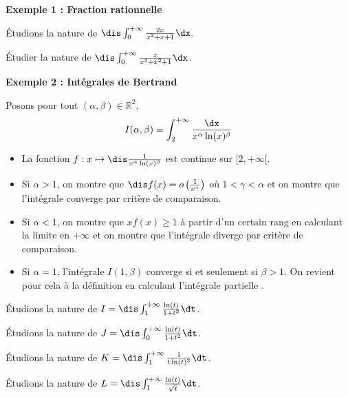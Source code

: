 \documentclass[a4paper,10pt]{report}
\begin{document}
\noindent \textbf{Exemple 1 : Fraction rationnelle}

\noindent Étudions la nature de $\dis \int_{0}^{+ \infty} \frac{2x}{x^2+x+1} \dx$.

\vspace{5cm}

\begin{exa} Étudier la nature de $\dis \int_{0}^{+ \infty} \frac{x}{x^3+x^2+1} \dx$.
\end{exa}

\medskip

\noindent \textbf{Exemple 2 : Intégrales de Bertrand}

\medskip

\noindent Posons pour tout $(\alpha, \beta) \in \mathbb{R}^2$, 
$$ I(\alpha, \beta) = \int_{2}^{+ \infty} \frac{\dx}{x^{\alpha} \ln(x)^{\beta}}$$

\begin{itemize}
\item La fonction $f: x \mapsto \dis \frac{1}{x^{\alpha} \ln(x)^{\beta}}$ est continue sur $[2, + \infty[$.
\item Si $\alpha>1$, on montre que $\dis f(x)=o \left( \frac{1}{x^{\gamma}} \right)$ où $1 < \gamma < \alpha$ et on montre que l'intégrale converge par critère de comparaison.
\item Si $\alpha<1$, on montre que $xf(x) \geq 1$ à partir d'un certain rang en calculant la limite en $+ \infty$ et on montre que l'intégrale diverge par critère de comparaison.
\item Si $\alpha=1$, l'intégrale $I(1, \beta)$ converge si et seulement si $\beta>1$. On revient pour cela à la définition en calculant \og l'intégrale partielle \fg .
\end{itemize}

\medskip

\noindent Étudions la nature de $I=\dis \int_{1}^{+ \infty} \frac{\ln(t)}{1+t^2} \dt$.

\vspace{5cm}

\noindent Étudions la nature de $J=\dis \int_{0}^{+ \infty} \frac{\ln(t)}{1+t^2} \dt$.

\vspace{5cm}

\noindent Étudions la nature de $K=\dis \int_{1}^{+ \infty} \frac{1}{t \ln(t)^3} \dt$.

\vspace{5cm}

\newpage
\noindent Étudions la nature de $L=\dis \int_{1}^{+ \infty} \frac{\ln(t)}{\sqrt{t}} \dt$.
\end{document}
